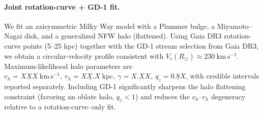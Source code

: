 \paragraph{Joint rotation-curve + GD-1 fit.}
We fit an axisymmetric Milky Way model with a Plummer bulge, a Miyamoto–Nagai disk,
and a generalized NFW halo (flattened). Using Gaia DR3 rotation-curve points (5–25 kpc)
together with the GD-1 stream selection from Gaia DR3, we obtain a circular-velocity
profile consistent with \(V_c(R_\odot)\approx 230~\mathrm{km\,s^{-1}}\).
Maximum-likelihood halo parameters are
\(v_h=\underline{XXX}~\mathrm{km\,s^{-1}},\ r_h=\underline{XX.X}~\mathrm{kpc},\ \gamma=\underline{X.XX},\ q_z=\underline{0.8X}\),
with credible intervals reported separately. Including GD-1 significantly sharpens the
halo flattening constraint (favoring an oblate halo, \(q_z<1\)) and reduces the
\(v_h\)–\(r_h\) degeneracy relative to a rotation-curve–only fit.
